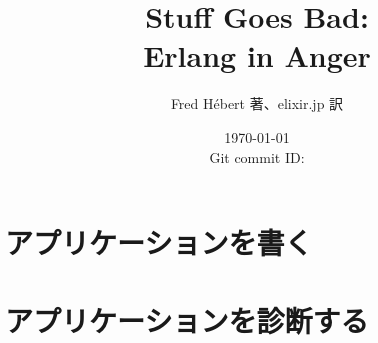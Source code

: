 \documentclass[autodetect-engine, dvipdfmx-if-dvi, base=11pt, ja=standard, openany]{bxjsbook}
\title{Stuff Goes Bad:\protect\\ Erlang in Anger}
\author{Fred Hébert 著、elixir.jp 訳}
\date{%
  \today \\
  Git commit ID: \href{https://github.com/ymotongpoo/erlang-in-anger}{\GITAbrHash}
}
\begin{document}
\frontmatter

\maketitle





\clearpage

\tableofcontents

\listoffigures

\hypersetup{linkcolor=violet}



\mainmatter

\part{アプリケーションを書く}
\label{part:writing-applications}





\part{アプリケーションを診断する}
\label{part:diagnosing-applictions}
















\backmatter


\end{document}
